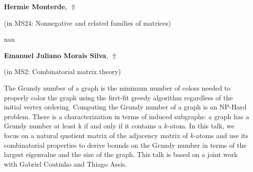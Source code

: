 \documentclass[ILAS2025-program.tex]{subfiles}
\begin{document}
     \hypertarget{down0351}{}\begin{ilasabstract}
    
    \textbf{Hermie Monterde},  \hfill \hyperlink{up0351}{$\Uparrow$}
    
    (in {\color{mstitle}MS24: Nonnegative and related families of matrices})
        
        \mtskip
    nan\end{ilasabstract}
     \hypertarget{down0143}{}\begin{ilasabstract}
    
    \textbf{Emanuel Juliano Morais Silva},  \hfill \hyperlink{up0143}{$\Uparrow$}
    
    (in {\color{mstitle}MS2: Combinatorial matrix theory})
        
        \mtskip
    The Grundy number of a graph is the minimum number of colors needed to properly color the graph using the first-fit greedy algorithm regardless of the initial vertex ordering. Computing the Grundy number of a graph is an NP-Hard problem. There is a characterization in terms of induced subgraphs: a graph has a Grundy number at least k if and only if it contains a $k$-atom. 
In this talk, we focus on a natural quotient matrix of the adjacency matrix of $k$-atoms and use its combinatorial properties to derive bounds on the Grundy number in terms of the largest eigenvalue and the size of the graph.
This talk is based on a joint work with Gabriel Coutinho and Thiago Assis.
\end{ilasabstract}
\end{document}
